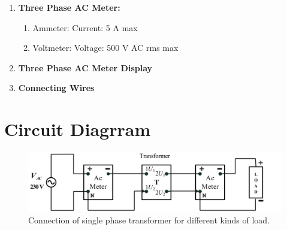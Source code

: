 \documentclass[a4paper,12pt]{article}
\begin{document}
\begin{enumerate}
		\item \textbf{Three Phase AC Meter:}
		\begin{enumerate}
			\item Ammeter: Current: 5 A max
			\item Voltmeter: Voltage: 500 V AC rms max
		\end{enumerate}
		
		\item \textbf{Three Phase AC Meter Display}
		\item \textbf{Connecting Wires}
	\end{enumerate}
	
	
	\section{Circuit Diagrram}
	
	
	\begin{figure}[H]
		\centering
		
			\centering
			\includegraphics[width=1\linewidth]{Images/09}
			\caption{Connection of single phase transformer for different kinds of load.}
			\vspace{0.5cm}

	\end{figure}
	
	\newpage
\end{document}
